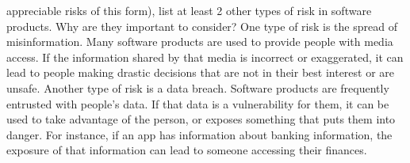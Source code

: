 \documentclass{article}
\begin{document}
\begin{enumerate}
    appreciable risks of this form), list at least 2 other types of risk in
    software products. Why are they important to consider?
    One type of risk is the spread of misinformation. Many software products are used to provide people with media access.
    If the information shared by that media is incorrect or exaggerated, it can lead to people making drastic decisions that are not in their best interest or are unsafe.
    Another type of risk is a data breach. Software products are frequently entrusted with people's data.
    If that data is a vulnerability for them, it can be used to take advantage of the person, or exposes something that puts them into danger.
    For instance, if an app has information about banking information, the exposure of that information can lead to someone accessing their finances.

\end{enumerate}
\end{document}
